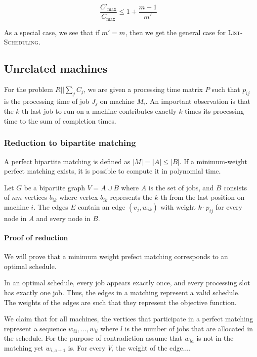 \documentclass{idc_msc}
\begin{document}
\[\frac{C'_{\max}}{C_{\max}} \le 1 + \frac{m - 1}{m'}\]

As a special case, we see that if \(m' = m\), then we get the general case for \textsc{List-Scheduling}.

\subsection{Unrelated machines}

For the problem \(R||\sum_j C_j\), we are given a processing time matrix \(P\) such that \(p_{ij}\) is the processing time of job \(J_j\) on machine \(M_i\).
An important observation is that the \(k\)-th last job to run on a machine contributes exactly \(k\) times its processing time to the sum of completion times.

\subsubsection{Reduction to bipartite matching}

A perfect bipartite matching is defined as \(|M| = |A| \le |B|\). If a minimum-weight perfect matching exists, it is possible to compute it in polynomial time.

Let \(G\) be a bipartite graph \(V=A \cup B\) where \(A\) is the set of jobs, and \(B\) consists of \(nm\) vertices \(b_{ik}\) where vertex \(b_{ik}\) represents the \(k\)-th from the last position on machine \(i\).
The edges \(E\) contain an edge \((v_j, w_{ik})\) with weight \(k \cdot p_{ij}\) for every node in \(A\) and every node in \(B\).

\paragraph{Proof of reduction}

We will prove that a minimum weight prefect matching corresponds to an optimal schedule.

In an optimal schedule, every job appears exactly once, and every processing slot has exactly one job.
Thus, the edges in a matching represent a valid schedule.
The weights of the edges are such that they represent the objective function.

We claim that for all machines, the vertices that participate in a perfect matching represent a sequence \(w_{i1}, \ldots, w_{il}\) where \(l\) is the number of jobs that are allocated in the schedule.
For the purpose of contradiction assume that \(w_{ia}\) is not in the matching yet \(w_{i,a+1}\) is.
For every \(V\), the weight of the edge....
\end{document}
